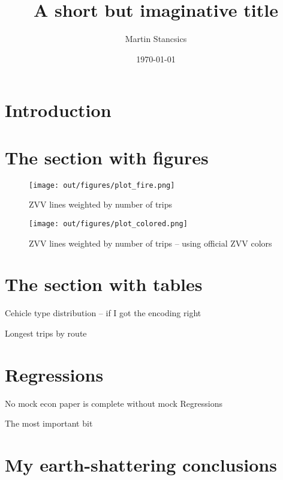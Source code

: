 \documentclass[a4paper]{article}
\author{Martin Stancsics}
\title{A short but imaginative title}
\date{\today}
\begin{document}
\maketitle

\section{Introduction}
\lipsum[1-3]

\section{The section with figures}
\lipsum[4]
\begin{figure}
    \centering
    \texttt{[image: out/figures/plot\_fire.png]}
    \caption{ZVV lines weighted by number of trips}
\end{figure}
\lipsum[5]
\begin{figure}
    \centering
    \texttt{[image: out/figures/plot\_colored.png]}
    \caption{ZVV lines weighted by number of trips -- using official ZVV colors}
\end{figure}

\section{The section with tables}
\lipsum[6]
\begin{table}
    \centering
    \caption{Cehicle type distribution -- if I got the encoding right}
    
\end{table}
\lipsum[7]
\begin{table}
    \centering
    \caption{Longest trips by route}
    
\end{table}

\section{Regressions}
No mock econ paper is complete without mock Regressions
\begin{table}
    \centering
    \caption{The most important bit}
    
\end{table}

\section{My earth-shattering conclusions}
\lipsum[8-9]
\end{document}
